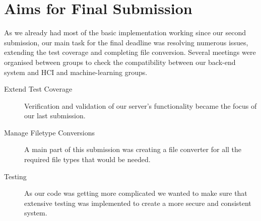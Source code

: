 \section{Aims for Final Submission}
As we already had most of the basic implementation working since our second submission, our main task for the final deadline was resolving numerous issues, extending the test coverage and completing file conversion. Several meetings were organised between groups to check the compatibility between our back-end system and HCI and machine-learning groups.
\begin{description}
  \item[Extend Test Coverage] Verification and validation of our server's functionality became the focus of our last submission.
  \item[Manage Filetype Conversions] A main part of this submission was creating a file converter for all the required file types that would be needed.
  \item[Testing] As our code was getting more complicated we wanted to make sure that extensive testing was implemented to create a more secure and consistent system.
\end{description}
